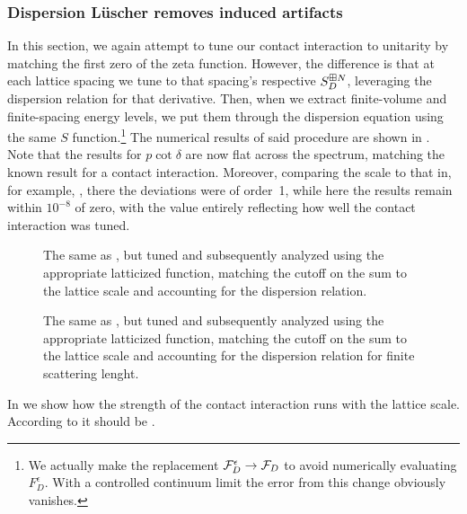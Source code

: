 \subsubsection{Dispersion L\"{u}scher removes induced artifacts}

In this section, we again attempt to tune our contact interaction to unitarity by matching the first zero of the \Luscher zeta function.
However, the difference is that at each lattice spacing we tune to that spacing's respective $S^{\boxplus N}_D$, leveraging the dispersion relation for that derivative.
Then, when we extract finite-volume and finite-spacing energy levels, we put them through the dispersion equation  using the same $S$ function.\footnote{We actually make the replacement $\mathcal{F}_D^\epsilon\rightarrow\mathcal{F}_D$ to avoid numerically evaluating $F_D^\epsilon$.  With a controlled continuum limit the error from this change obviously vanishes.}
The numerical results of said procedure are shown in .
Note that the results for $p\cot\delta$ are now flat across the spectrum, matching the known result for a contact interaction.
Moreover, comparing the scale to that in, for example, , there the deviations were of order~1, while here the results remain within $10^{-8}$ of zero, with the value entirely reflecting how well the contact interaction was tuned.

\begin{figure}
    
    \caption{The same as , but tuned and subsequently analyzed using the appropriate latticized \Luscher function, matching the cutoff on the sum to the lattice scale and accounting for the dispersion relation.}
    \label{fig:unimproved dispersion}
\end{figure}

\begin{figure}[th]
    
    \caption{The same as , but tuned and subsequently analyzed using the appropriate latticized \Luscher function, matching the cutoff on the sum to the lattice scale and accounting for the dispersion relation for finite scattering lenght.}
    \label{fig:unimproved dispersion finite a}
\end{figure}

In  we show how the strength of the contact interaction runs with the lattice scale.  According to  it should be .

